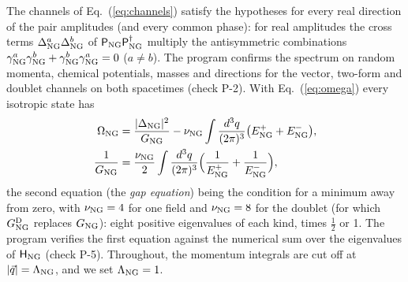 The channels of Eq.~(\ref{eq:channels}) satisfy the hypotheses for every real direction of the pair
amplitudes (and every common phase): for real amplitudes the cross terms $\Delta^a_{\rm NG}\Delta^b_{\rm NG}$
of $\mathsf P_{\rm NG}\mathsf P_{\rm NG}^\dagger$ multiply the antisymmetric combinations $\gamma^a_{\rm NG}
\gamma^b_{\rm NG}+\gamma^b_{\rm NG}\gamma^a_{\rm NG}=0$ ($a\ne b$). The program confirms the spectrum on random
momenta, chemical potentials, masses and directions for the vector, two-form and doublet channels on
both spacetimes (check P-2). With Eq.~(\ref{eq:omega}) every isotropic state has
\begin{align}
\Omega_{\rm NG}&=\frac{\lvert\Delta_{\rm NG}\rvert^2}{G_{\rm NG}}-\nu_{\rm NG}\int\frac{d^3q}{(2\pi)^3}
\big(E^+_{\rm NG}+E^-_{\rm NG}\big),\nonumber\\
\frac1{G_{\rm NG}}&=\frac{\nu_{\rm NG}}2\int\frac{d^3q}{(2\pi)^3}
\Big(\frac1{E^+_{\rm NG}}+\frac1{E^-_{\rm NG}}\Big),
\label{eq:gap}
\end{align}
the second equation (the \emph{gap equation}) being the condition for a minimum away from zero, with
$\nu_{\rm NG}=4$ for one field and $\nu_{\rm NG}=8$ for the doublet (for which $G^{\rm D}_{\rm NG}$ replaces
$G_{\rm NG}$): eight positive eigenvalues of each kind, times $\tfrac12$ or 1. The program verifies the
first equation against the numerical sum over the eigenvalues of $\mathsf H_{\rm NG}$ (check P-5).
Throughout, the momentum integrals are cut off at $\lvert\vec q\rvert=\Lambda_{\rm NG}$, and we set
$\Lambda_{\rm NG}=1$.

